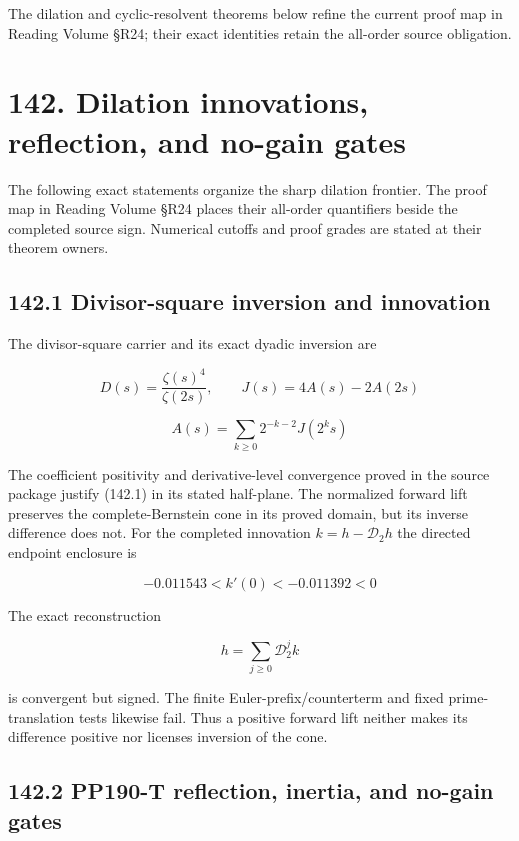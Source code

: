 \documentclass[
  11pt,
]{book}
\begin{document}
The dilation and cyclic-resolvent theorems below refine the current
proof map in Reading Volume §R24; their exact identities retain the
all-order source obligation.

\section{142. Dilation innovations, reflection, and no-gain
gates}\label{dilation-innovations-reflection-and-no-gain-gates}

The following exact statements organize the sharp dilation frontier. The
proof map in Reading Volume §R24 places their all-order quantifiers
beside the completed source sign. Numerical cutoffs and proof grades are
stated at their theorem owners.

\subsection{142.1 Divisor-square inversion and
innovation}\label{divisor-square-inversion-and-innovation}

The divisor-square carrier and its exact dyadic inversion are

\[
D(s)=\frac{\zeta(s)^4}{\zeta(2s)},\qquad
J(s)=4A(s)-2A(2s)
\]

\[
\boxed{
A(s)=\sum_{k\ge0}2^{-k-2}J(2^ks)}
\tag{142.1}
\]

The coefficient positivity and derivative-level convergence proved in
the source package justify (142.1) in its stated half-plane. The
normalized forward lift preserves the complete-Bernstein cone in its
proved domain, but its inverse difference does not. For the completed
innovation \(k=h-\mathscr D_2h\) the directed endpoint enclosure is

\[
\boxed{-0.011543<k'(0)<-0.011392<0}
\tag{142.2}
\]

The exact reconstruction

\[
\boxed{h=\sum_{j\ge0}\mathscr D_2^jk}
\tag{142.3}
\]

is convergent but signed. The finite Euler-prefix/counterterm and fixed
prime-translation tests likewise fail. Thus a positive forward lift
neither makes its difference positive nor licenses inversion of the
cone.

\subsection{142.2 PP190-T reflection, inertia, and no-gain
gates}\label{pp190-t-reflection-inertia-and-no-gain-gates}
\end{document}
